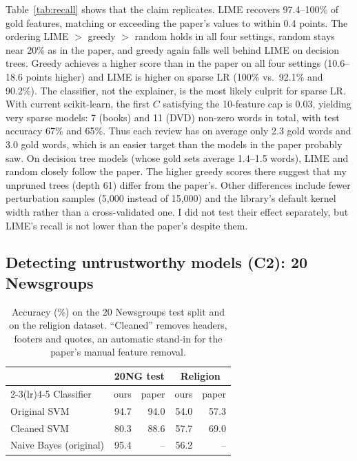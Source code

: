 \documentclass[11pt]{article}
\begin{document}
Table~\ref{tab:recall} shows that the claim replicates. LIME recovers 97.4--100\% of gold features, matching or exceeding the paper's values to within 0.4 points. The ordering LIME $>$ greedy $>$ random holds in all four settings, random stays near 20\% as in the paper, and greedy again falls well behind LIME on decision trees. Greedy achieves a higher score than in the paper on all four settings (10.6--18.6 points higher) and LIME is higher on sparse LR (100\% vs.\ 92.1\% and 90.2\%). The classifier, not the explainer, is the most likely culprit for sparse LR. With current scikit-learn, the first $C$ satisfying the 10-feature cap is 0.03, yielding very sparse models: 7 (books) and 11 (DVD) non-zero words in total, with test accuracy 67\% and 65\%. Thus each review has on average only 2.3 gold words and 3.0 gold words, which is an easier target than the models in the paper probably saw. On decision tree models (whose gold sets average 1.4--1.5 words), LIME and random closely follow the paper. The higher greedy scores there suggest that my unpruned trees (depth 61) differ from the paper's. Other differences include fewer perturbation samples (5,000 instead of 15,000) and the library's default kernel width rather than a cross-validated one. I did not test their effect separately, but LIME's recall is not lower than the paper's despite them.

\subsection{Detecting untrustworthy models (C2): 20 Newsgroups}

\begin{table}[t]
\centering\small
\begin{tabular}{@{}lrrrr@{}}
\toprule
& \multicolumn{2}{c}{20NG test} & \multicolumn{2}{c}{Religion} \\
\cmidrule(lr){2-3}\cmidrule(lr){4-5}
Classifier & ours & paper & ours & paper \\
\midrule
Original SVM & 94.7 & 94.0 & 54.0 & 57.3 \\
Cleaned SVM  & 80.3 & 88.6 & 57.7 & 69.0 \\
Naive Bayes (original) & 95.4 & -- & 56.2 & -- \\
\bottomrule
\end{tabular}
\caption{Accuracy (\%) on the 20 Newsgroups test split and on the religion dataset. ``Cleaned'' removes headers, footers and quotes, an automatic stand-in for the paper's manual feature removal.}
\label{tab:religion}
\end{table}
\end{document}
